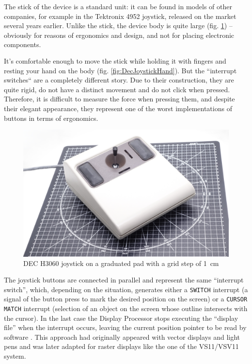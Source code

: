 \documentclass[11pt, a4paper]{article}
\begin{document}
The stick of the device is a standard unit: it can be found in models of other companies, for example in the Tektronix 4952 joystick, released on the market several years earlier. Unlike the stick, the device body is quite large (fig. \ref{fig:DecJoystickSize}) -- obviously for reasons of ergonomics and design, and not for placing electronic components.

It's comfortable enough to move the stick while holding it with fingers and resting your hand on the body (fig. \ref{fig:DecJoystickHand}). But the ``interrupt switches`` are a completely different story. Due to their construction, they are quite rigid, do not have a distinct movement and do not click when pressed. Therefore, it is difficult to measure the force when pressing them, and despite their elegant appearance, they represent one of the worst implementations of buttons in terms of ergonomics.

\begin{figure}[h]
    \centering
    \includegraphics[scale=0.35]{1978_dec_h3060_joystick/size_30.jpg}
    \caption{DEC H3060 joystick on a graduated pad with a grid step of 1~cm}
    \label{fig:DecJoystickSize}
\end{figure}

The joystick buttons are connected in parallel and represent the same ``interrupt switch'', which, depending on the situation, generates either a \verb|SWITCH| interrupt (a signal of the button press to mark the desired position on the screen) or a \verb|CURSOR MATCH| interrupt (selection of an object on the screen whose outline intersects with the cursor). In the last case the Display Processor stops executing the ``display file'' when the interrupt occurs, leaving the current position pointer to be read by software  \cite{vsv11}. This approach had originally appeared with vector displays and light pens and was later adapted for raster displays like the one of the VS11/VSV11 system.
\end{document}
